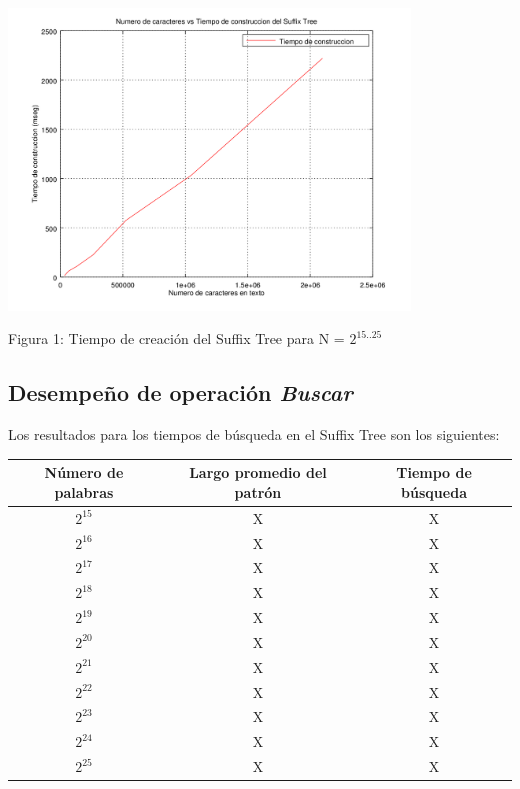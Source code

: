 \documentclass[letterpaper,10pt]{article}
\begin{document}
	\begin{center}
		\includegraphics[width=0.8\textwidth]{fig1.png}

		Figura 1: Tiempo de creación del Suffix Tree para N = $2^{15..25}$
	\end{center}

	\newpage

	\subsection{Desempeño de operación \textit{Buscar}}

	Los resultados para los tiempos de búsqueda en el Suffix Tree son los siguientes:

	\begin{center}
		\begin{tabular}{|c|c|c|}
			\hline
			Número de palabras & Largo promedio del patrón & Tiempo de búsqueda\\
			\hline
			$2^{15}$ & X & X\\
			\hline
			$2^{16}$ & X & X\\
			\hline
			$2^{17}$ & X & X\\
			\hline
			$2^{18}$ & X & X\\
			\hline
			$2^{19}$ & X & X\\
			\hline
			$2^{20}$ & X & X\\
			\hline
			$2^{21}$ & X & X\\
			\hline
			$2^{22}$ & X & X\\
			\hline
			$2^{23}$ & X & X\\
			\hline
			$2^{24}$ & X & X\\
			\hline
			$2^{25}$ & X & X\\
			\hline
		\end{tabular}
	\end{center}
\end{document}
